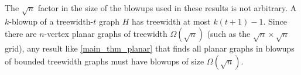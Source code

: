 \documentclass{patmorin}
\newcommand{\david}[1]{{\color{orange} David: #1}}
\newcommand{\pat}[1]{\textcolor{Blue}{Pat: #1}}
\DeclareMathOperator{\polylog}{polylog}
\begin{document}
The $\sqrt{n}$ factor in the size of the blowups used in these results is not arbitrary. A $k$-blowup of a treewidth-$t$ graph $H$ has treewidth at most $k(t+1)-1$.  Since there are $n$-vertex planar graphs of treewidth $\Omega(\sqrt{n})$ (such as the $\sqrt{n}\times\sqrt{n}$ grid), any result like \cref{main_thm_planar} that finds all planar graphs in blowups of bounded treewidth graphs must have blowups of size $\Omega(\sqrt{n})$.


\end{document}
